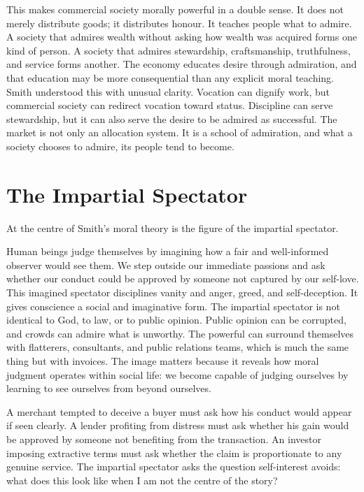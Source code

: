 \documentclass[11pt,a4paper,oneside]{book}
\begin{document}
This makes commercial society morally powerful in a double sense. It does not merely distribute goods; it distributes honour. It teaches people what to admire. A society that admires wealth without asking how wealth was acquired forms one kind of person. A society that admires stewardship, craftsmanship, truthfulness, and service forms another. The economy educates desire through admiration, and that education may be more consequential than any explicit moral teaching. Smith understood this with unusual clarity. Vocation can dignify work, but commercial society can redirect vocation toward status. Discipline can serve stewardship, but it can also serve the desire to be admired as successful. The market is not only an allocation system. It is a school of admiration, and what a society chooses to admire, its people tend to become.

\section*{The Impartial Spectator}

At the centre of Smith's moral theory is the figure of the impartial spectator.

Human beings judge themselves by imagining how a fair and well-informed observer would see them. We step outside our immediate passions and ask whether our conduct could be approved by someone not captured by our self-love. This imagined spectator disciplines vanity and anger, greed, and self-deception. It gives conscience a social and imaginative form. The impartial spectator is not identical to God, to law, or to public opinion. Public opinion can be corrupted, and crowds can admire what is unworthy. The powerful can surround themselves with flatterers, consultants, and public relations teams, which is much the same thing but with invoices. The image matters because it reveals how moral judgment operates within social life: we become capable of judging ourselves by learning to see ourselves from beyond ourselves.

A merchant tempted to deceive a buyer must ask how his conduct would appear if seen clearly. A lender profiting from distress must ask whether his gain would be approved by someone not benefiting from the transaction. An investor imposing extractive terms must ask whether the claim is proportionate to any genuine service. The impartial spectator asks the question self-interest avoids: what does this look like when I am not the centre of the story?
\end{document}
